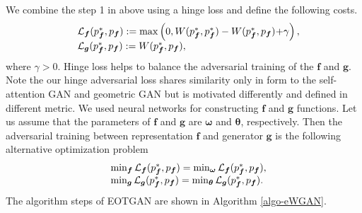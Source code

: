 We combine the step 1 in above using a hinge loss and define the following costs.
\begin{equation}
  \begin{array}{rl}
    &\mathcal{L}_{\bm{f}}(p^{\ast}_{\bm{f}}, p_{\bm{f}}) := \max\left(0, W(p^{\ast}_{\bm{f}}, p^{\ast}_{\bm{f}})- W(p^{\ast}_{\bm{f}}, p_{\bm{f}}) \hspace{-2pt}+\hspace{-2pt} \gamma \right),\\
    &\mathcal{L}_{\bm{g}}(p^{\ast}_{\bm{f}}, p_{\bm{f}}) := W(p^{\ast}_{\bm{f}}, p_{\bm{f}}),
  \end{array}
\end{equation}
where $\gamma>0$. Hinge loss helps to balance the adversarial training of the $\bm{f}$ and $\bm{g}$.
Note the our hinge adversarial loss shares similarity only in form to the self-attention GAN\cite{2018arXiv180508318Z} and geometric GAN\cite{2017arXiv170502894L} but is motivated differently and defined in different metric. We used neural networks for constructing $\bm{f}$ and $\bm{g}$ functions. Let us assume that the parameters of $\bm{f}$ and $\bm{g}$ are $\bm{\omega}$ and $\bm{\theta}$, respectively. Then the adversarial training between representation $\bm{f}$ and
generator $\bm{g}$ is the following alternative optimization problem
\begin{equation}
  \begin{array}{rl}
    &\min_{\bm{f}} \Ll_{\bm{f}}(p^{\ast}_{\bm{f}}, p_{\bm{f}}) = \min_{\bm{\omega}} \Ll_{\bm{f}}(p^{\ast}_{\bm{f}}, p_{\bm{f}}), \\ 
    &\min_{\bm{g}}\Ll_{\bm{g}}(p^{\ast}_{\bm{f}}, p_{\bm{f}}) = \min_{\bm{\th}}\Ll_{\bm{g}}(p^{\ast}_{\bm{f}}, p_{\bm{f}}).
  \end{array}\vspace{-2pt}
\end{equation}
The algorithm steps of EOTGAN are shown in Algorithm \ref{algo-eWGAN}.


